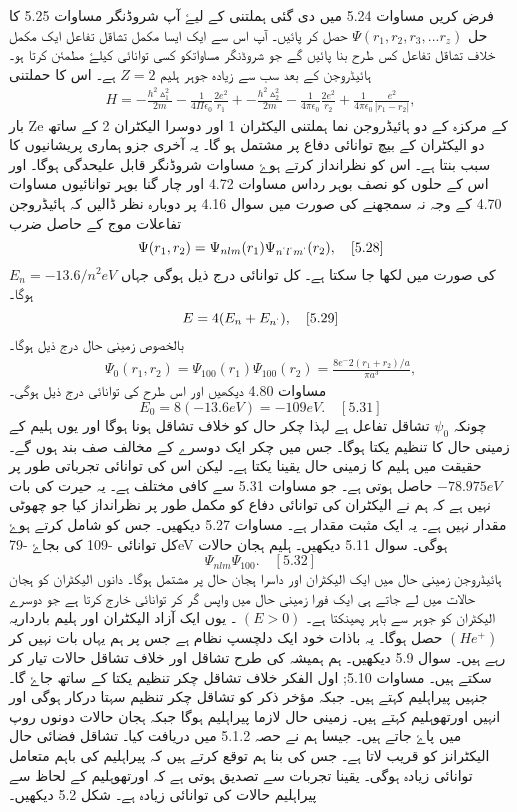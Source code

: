 فرض کریں مساوات 5.24 میں دی گئی ہملتنی کے لیۓ آپ شروڈنگر مساوات 5.25 کا حل $ \Psi(r_{1} , r_{2}, r_{3},...r_{z}) $ حصل کر پائیں۔ آپ اس سے ایک ایسا مکمل تشاقل تفاعل ایک مکمل خلاف تشاقل تفاعل کس طرح بنا پائیں گے جو شروڈنگر مساواتکو کسی توانائی کیلۓ مطمئن کرتا ہو۔
ہائیڈروجن کے بعد سب سے زیادہ جوہر ہلیم $ Z=2 $ ہے۔ اس کا حملتنی
\begin{align}
H= { -\frac{h^2 \vartriangle^2 _{1}}{2m} -\frac{1}{4\Pi\epsilon_{0}} \frac{2e^2}{r_{1}}} + { -\frac{h^2 \vartriangle^2 _{2}}{2m}-\frac{1}{4 \pi \epsilon_{0}} \frac{2e^2}{r_{2}}}+ \frac{1}{4 \pi \epsilon_{0}}\frac{e^2}{|r_{1} -r_{2}|},
\end{align}
بار Ze کے مرکزہ کے دو ہائیڈروجن نما ہملتنی الیکٹران 1 اور دوسرا الیکٹران 2 کے ساتھ دو الیکٹران کے بیچ توانائی دفاع پر مشتمل ہو گا۔ یہ آخری جزو ہماری پریشانیوں کا سبب بنتا ہے۔ اس کو نظرانداز کرتے ہوۓ مساوات شروڈنگر قابل علیحدگی ہوگا۔ اور اس کے حلوں کو نصف بوہر رداس مساوات 4.72 اور چار گنا بوہر توانائیوں مساوات 4.70 کے وجہ نہ سمجھنے کی صورت میں سوال 4.16 پر دوبارہ نظر ڈالیں کہ ہائیڈروجن تفاعلات موج کے حاصل ضرب 
$$ \Psi(r_{1}, r_{2})= \Psi_{nlm} (r_{1}) \Psi_{n^{`} l^{`} m^{`}} (r_{2}), \quad [5.28] $$
کی صورت میں لکھا جا سکتا ہے۔ کل توانائی درج ذیل ہوگی جہاں $ E_{n}=-13.6/n^2 eV $ ہوگا۔
$$ E= 4(E_{n} +E_{n^{`}}), \quad [5.29] $$
بالخصوص زمینی حال درج ذیل ہوگا۔
\begin{align}
\Psi_{0}(r_{1}, r_{2})=\Psi_{100}(r_{1}) \Psi_{100}(r_{2})=\frac{8e^-2(r_{1} + r_{2})/a}{\pi a^3},
\end{align}
مساوات 4.80 دیکھیں اور اس طرح کی توانائی درج ذیل ہوگی۔
$$ E_{0}=8(-13.6eV)=-109 eV . \quad [5.31] $$
چونکہ $ \psi_{0} $ تشاقل تفاعل ہے لہذا چکر حال کو خلاف تشاقل ہونا ہوگا اور یوں ہلیم کے زمینی حال کا تنظیم یکتا ہوگا۔ جس میں چکر ایک دوسرے کے مخالف صف بند ہوں گے۔ حقیقت میں ہلیم کا زمینی حال یقینا یکتا ہے۔ لیکن اس کی توانائی تجرباتی طور پر $ -78.975eV $ حاصل ہوتی ہے۔ جو مساوات 5.31 سے کافی مختلف ہے۔ یہ حیرت کی بات نہیں ہے کہ ہم نے الیکٹران کی توانائی دفاع کو مکمل طور پر نظرانداز کیا جو چھوٹی مقدار نہیں ہے۔ یہ ایک مثبت مقدار ہے۔ مساوات 5.27 دیکھیں۔ جس کو شامل کرتے ہوۓ کل توانائی  -109 کی بجاۓ -79eV ہوگی۔ سوال 5.11 دیکھیں۔ ہلیم ہجان حالات 
$$ \Psi_{nlm} \Psi_{100} . \quad [5.32] $$
ہائیڈروجن زمینی حال میں ایک الیکٹران اور داسرا ہجان حال پر مشتمل ہوگا۔ دانوں الیکٹران کو ہجان حالات میں لے جاتے ہی ایک فورا زمینی حال میں واپس گر کر توانائی خارج کرتا ہے جو دوسرے الیکٹران کو جوہر سے باہر  پھینکتا ہے۔ $ (E>0) $ ۔ یوں ایک آزاد الیکٹران اور ہلیم بارداریہ $ ( He^+ ) $ حصل ہوگا۔ یہ باذات خود ایک
دلچسپ نظام ہے جس پر ہم یہاں بات نہیں کر رہے ہیں۔ سوال 5.9 دیکھیں۔ ہم ہمیشہ کی طرح تشاقل اور خلاف تشاقل حالات تیار کر سکتے ہیں۔ مساوات 5.10;  اول الفکر خلاف تشاقل چکر تنظیم یکتا کے ساتھ جاۓ گا۔ جنہیں پیراہلیم کہتے ہیں۔ جبکہ مؤخر ذکر کو تشاقل چکر تنظیم سہتا درکار ہوگی اور انہیں اورتھوہلیم کہتے ہیں۔ زمینی حال لازما پیراہلیم ہوگا جبکہ ہجان حالات دونوں روپ میں پاۓ جاتے ہیں۔ جیسا ہم نے حصہ 5.1.2 میں دریافت کیا۔ تشاقل فضائی حال الیکٹرانز کو قریب لاتا ہے۔ جس کی بنا ہم توقع کرتے ہیں کہ پیراہلیم کی باہم متعامل توانائی زیادہ ہوگی۔ یقینا تجربات سے تصدیق ہوتی ہے کہ اورتھوہلیم کے لحاظ سے پیراہلیم حالات کی توانائی زیادہ ہے۔ شکل 5.2 دیکھیں۔

